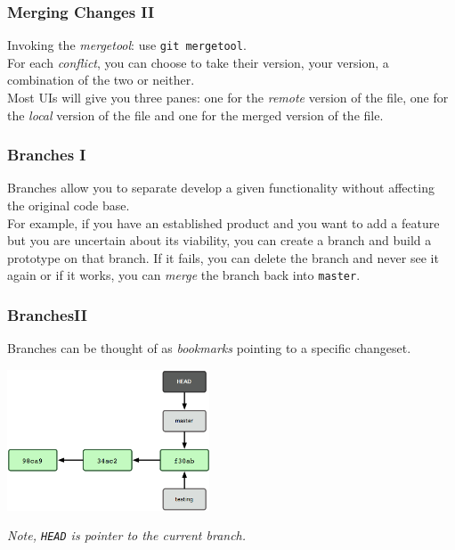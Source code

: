 \documentclass{beeper}
\begin{document}
\begin{frame}
    \frametitle{Merging Changes II}

    Invoking the \textit{mergetool}: use \texttt{git mergetool}.\\

    For each \textit{conflict}, you can choose to take their version, your
    version, a combination of the two or neither.\\

    Most UIs will give you three panes: one for the \textit{remote} version of
    the file, one for the \textit{local} version of the file and one for the
    merged version of the file.

\end{frame}

\begin{frame}
    \frametitle{Branches I}

    Branches allow you to separate develop a given functionality without
    affecting the original code base.\\

    For example, if you have an established product and you want to add a
    feature but you are uncertain about its viability, you can create a branch
    and build a prototype on that branch. If it fails, you can delete the branch
    and never see it again or if it works, you can \textit{merge} the branch
    back into \texttt{master}.
\end{frame}

\begin{frame}
    \frametitle{Branches\footnotemark II}
    Branches can be thought of as \textit{bookmarks} pointing to a specific
    changeset.

    \begin{center}
        \includegraphics[width=60mm]{graphics/branching1.png}
    \end{center}

    \textit{Note, \texttt{HEAD} is pointer to the current branch.}

\end{frame}
\end{document}
